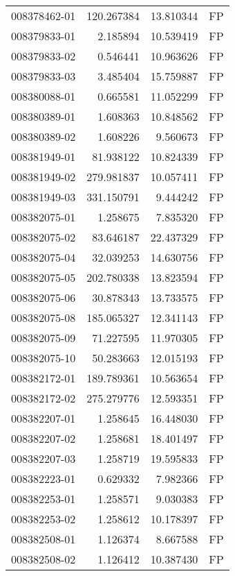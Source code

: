 \begin{tabular}{lrrl}
008378462-01 &  120.267384 &      13.810344 &   FP \\
008379833-01 &    2.185894 &      10.539419 &   FP \\
008379833-02 &    0.546441 &      10.963626 &   FP \\
008379833-03 &    3.485404 &      15.759887 &   FP \\
008380088-01 &    0.665581 &      11.052299 &   FP \\
008380389-01 &    1.608363 &      10.848562 &   FP \\
008380389-02 &    1.608226 &       9.560673 &   FP \\
008381949-01 &   81.938122 &      10.824339 &   FP \\
008381949-02 &  279.981837 &      10.057411 &   FP \\
008381949-03 &  331.150791 &       9.444242 &   FP \\
008382075-01 &    1.258675 &       7.835320 &   FP \\
008382075-02 &   83.646187 &      22.437329 &   FP \\
008382075-04 &   32.039253 &      14.630756 &   FP \\
008382075-05 &  202.780338 &      13.823594 &   FP \\
008382075-06 &   30.878343 &      13.733575 &   FP \\
008382075-08 &  185.065327 &      12.341143 &   FP \\
008382075-09 &   71.227595 &      11.970305 &   FP \\
008382075-10 &   50.283663 &      12.015193 &   FP \\
008382172-01 &  189.789361 &      10.563654 &   FP \\
008382172-02 &  275.279776 &      12.593351 &   FP \\
008382207-01 &    1.258645 &      16.448030 &   FP \\
008382207-02 &    1.258681 &      18.401497 &   FP \\
008382207-03 &    1.258719 &      19.595833 &   FP \\
008382223-01 &    0.629332 &       7.982366 &   FP \\
008382253-01 &    1.258571 &       9.030383 &   FP \\
008382253-02 &    1.258612 &      10.178397 &   FP \\
008382508-01 &    1.126374 &       8.667588 &   FP \\
008382508-02 &    1.126412 &      10.387430 &   FP \\

\end{tabular}

